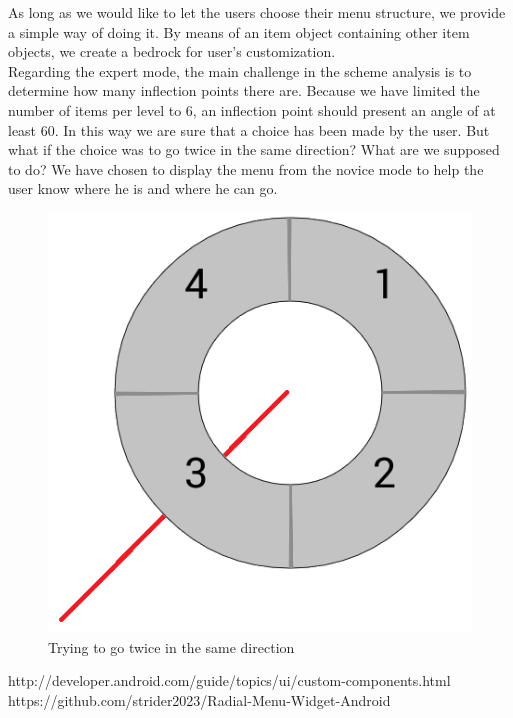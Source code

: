 \documentclass[conference]{IEEEtran}
\begin{document}
As long as we would like to let the users choose their menu structure, we provide a simple way of doing it. By means of an item object containing other item objects, we create a bedrock for user's customization.\\

Regarding the expert mode, the main challenge in the scheme analysis is to determine how many inflection points there are. Because we have limited the number of items per level to 6, an inflection point should present an angle of at least 60. In this way we are sure that a choice has been made by the user. But what if the choice was to go twice in the same direction? What are we supposed to do? We have chosen to display the menu from the novice mode to help the user know where he is and where he can go.

\begin{figure}[!ht] 
		\centering
		\includegraphics[scale = 0.5]{figure6.png} %
		\caption{Trying to go twice in the same direction}
		\label{linear-marking_menus}
\end{figure}

\begin{thebibliography}{}
http://developer.android.com/guide/topics/ui/custom-components.html
https://github.com/strider2023/Radial-Menu-Widget-Android

\end{thebibliography}
\end{document}
